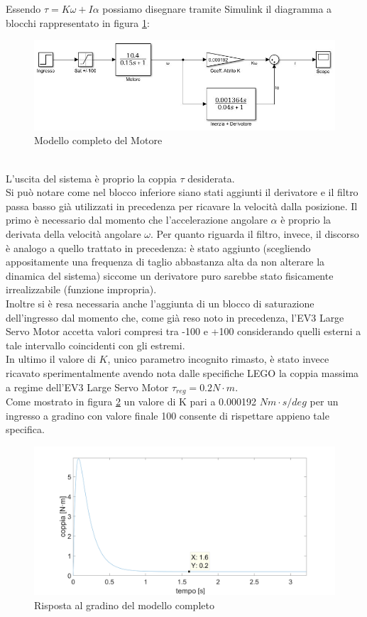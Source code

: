 Essendo $\tau=K\omega+I\alpha$ possiamo disegnare tramite Simulink il diagramma a blocchi rappresentato in figura \ref{modMotoreTorque}:
\begin{figure}[ht]
	\centering
	\includegraphics[width=\textwidth]{modMotoreTorque.jpg}
	\caption{Modello completo del Motore}
	\label{modMotoreTorque}
\end{figure}
\\L'uscita del sistema è proprio la coppia $\tau$ desiderata.\\
Si può notare come nel blocco inferiore siano stati aggiunti il derivatore e il filtro passa basso già utilizzati in precedenza per ricavare la velocità dalla posizione. Il primo è necessario dal momento che l'accelerazione angolare $\alpha$ è proprio la derivata della velocità angolare $\omega$. Per quanto riguarda il filtro, invece,
il discorso è analogo a quello trattato in precedenza:
è stato aggiunto (scegliendo appositamente una frequenza di taglio abbastanza alta da non alterare la dinamica del sistema) siccome un derivatore puro sarebbe stato fisicamente irrealizzabile (funzione impropria).\\
Inoltre si è resa necessaria anche l'aggiunta di un blocco di saturazione dell'ingresso dal momento che, come già reso noto in precedenza, l'EV3 Large Servo Motor accetta valori compresi tra -100 e +100 considerando quelli esterni a tale intervallo coincidenti con gli estremi.\\
In ultimo il valore di $K$, unico parametro incognito rimasto, è stato invece ricavato sperimentalmente avendo nota dalle specifiche LEGO la coppia massima a regime dell'EV3 Large Servo Motor $\tau_{reg}=0.2N\cdot m$.\\
Come mostrato in figura \ref{torque02} un valore di K pari a 0.000192 $Nm\cdot s/deg$ per un ingresso a gradino con valore finale 100 consente di rispettare appieno tale specifica.
\begin{figure}[ht]
	\centering
	\includegraphics[width=\textwidth]{torque192.png}
	\caption{Risposta al gradino del modello completo}
	\label{torque02}
\end{figure}
